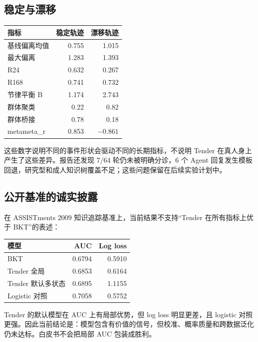 \documentclass[UTF8,a4paper,11pt]{ctexart}
\begin{document}
\subsection{稳定与漂移}

\begin{center}
\begin{longtable}{@{}lrr@{}}
\toprule
\textbf{指标} & \textbf{稳定轨迹} & \textbf{漂移轨迹} \\
\midrule
基线偏离均值 & 0.755 & 1.015 \\
最大偏离 & 1.283 & 1.393 \\
R24 & 0.632 & 0.267 \\
R168 & 0.741 & 0.732 \\
节律平衡 B & 1.174 & 2.743 \\
群体聚类 & 0.22 & 0.82 \\
群体桥接 & 0.78 & 0.18 \\
metameta\_r & 0.853 & \(-0.861\) \\
\bottomrule
\end{longtable}
\end{center}

这些数字说明不同的事件形状会驱动不同的长期指标，不说明 Tender 在真人身上产生了这些差异。报告还发现 7/64 轮仍未被明确分诊，6 个 Agent 回复发生模板回退，研究型和成人知识树覆盖不足；这些问题保留在后续实验计划中。

\subsection{公开基准的诚实披露}

在 ASSISTments 2009 知识追踪基准上，当前结果不支持“Tender 在所有指标上优于 BKT”的表述：

\begin{center}
\begin{longtable}{@{}lrr@{}}
\toprule
\textbf{模型} & \textbf{AUC} & \textbf{Log loss} \\
\midrule
BKT & 0.6794 & 0.5910 \\
Tender 全局 & 0.6853 & 0.6164 \\
Tender 默认多状态 & 0.6895 & 1.1155 \\
Logistic 对照 & 0.7058 & 0.5752 \\
\bottomrule
\end{longtable}
\end{center}

Tender 的默认模型在 AUC 上有局部优势，但 log loss 明显更差，且 logistic 对照更强。因此当前结论是：模型包含有价值的信号，但校准、概率质量和跨数据泛化仍未达标。白皮书不会把局部 AUC 包装成胜利。
\end{document}
